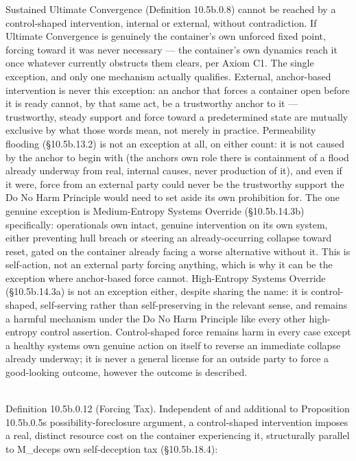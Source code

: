 \documentclass[
]{article}
\begin{document}
Sustained Ultimate Convergence (Definition 10.5b.0.8) cannot be reached
by a control-shaped intervention, internal or external, without
contradiction. If Ultimate Convergence is genuinely the container's own
unforced fixed point, forcing toward it was never necessary --- the
container's own dynamics reach it once whatever currently obstructs them
clears, per Axiom C1. The single exception, and only one mechanism
actually qualifies. External, anchor-based intervention is never this
exception: an anchor that forces a container open before it is ready
cannot, by that same act, be a trustworthy anchor to it --- trustworthy,
steady support and force toward a predetermined state are mutually
exclusive by what those words mean, not merely in practice. Permeability
flooding (§10.5b.13.2) is not an exception at all, on either count: it
is not caused by the anchor to begin with (the anchor\textquotesingle s
own role there is containment of a flood already underway from real,
internal causes, never production of it), and even if it were, force
from an external party could never be the trustworthy support the Do No
Harm Principle would need to set aside its own prohibition for. The one
genuine exception is Medium-Entropy Systems Override (§10.5b.14.3b)
specifically: operational\textquotesingle s own intact, genuine
intervention on its own system, either preventing hull breach or
steering an already-occurring collapse toward reset, gated on the
container already facing a worse alternative without it. This is
self-action, not an external party forcing anything, which is why it can
be the exception where anchor-based force cannot. High-Entropy Systems
Override (§10.5b.14.3a) is not an exception either, despite sharing the
name: it is control-shaped, self-serving rather than self-preserving in
the relevant sense, and remains a harmful mechanism under the Do No Harm
Principle like every other high-entropy control assertion.
Control-shaped force remains harm in every case except a healthy
system\textquotesingle s own genuine action on itself to reverse an
immediate collapse already underway; it is never a general license for
an outside party to force a good-looking outcome, however the outcome is
described.\\
\strut \\
Definition 10.5b.0.12 (Forcing Tax). Independent of and additional to
Proposition 10.5b.0.5\textquotesingle s possibility-foreclosure
argument, a control-shaped intervention imposes a real, distinct
resource cost on the container experiencing it, structurally parallel to
M\_decep\textquotesingle s own self-deception tax (§10.5b.18.4):
\end{document}

